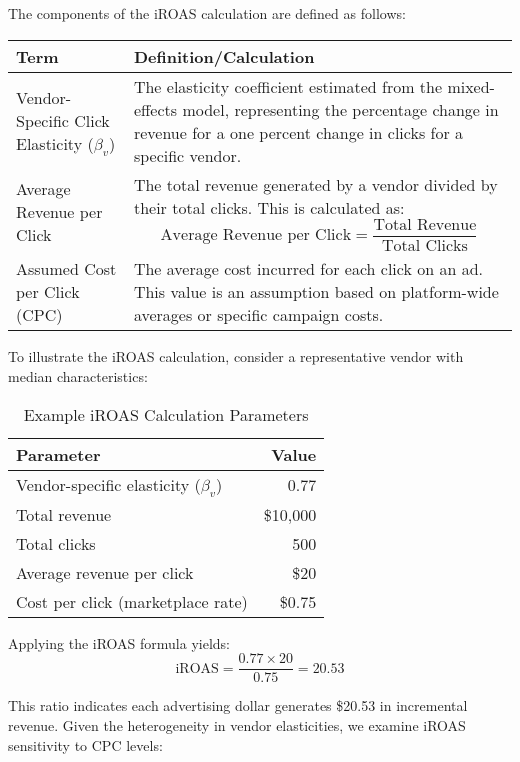 The components of the iROAS calculation are defined as follows:
\begin{center}
\begin{tabular}{p{} p{}}
\toprule
Term & Definition/Calculation \\
\midrule
Vendor-Specific Click Elasticity ($\beta_v$) & The elasticity coefficient estimated from the mixed-effects model, representing the percentage change in revenue for a one percent change in clicks for a specific vendor. \\
Average Revenue per Click & The total revenue generated by a vendor divided by their total clicks. This is calculated as:
\begin{equation*} 
\text{Average Revenue per Click} = \frac{\text{Total Revenue}}{\text{Total Clicks}}
\end{equation*} \\
Assumed Cost per Click (CPC) & The average cost incurred for each click on an ad. This value is an assumption based on platform-wide averages or specific campaign costs. \\
\bottomrule
\end{tabular}
\end{center}

To illustrate the iROAS calculation, consider a representative vendor with median characteristics:

\begin{table}[htbp!]
\centering
\caption{Example iROAS Calculation Parameters}
\begin{tabular}{lr}
\toprule
Parameter & Value \\
\midrule
Vendor-specific elasticity ($\beta_v$) & 0.77 \\
Total revenue & \$10,000 \\
Total clicks & 500 \\
Average revenue per click & \$20 \\
Cost per click (marketplace rate) & \$0.75 \\
\bottomrule
\end{tabular}
\end{table}

Applying the iROAS formula yields:
\begin{equation}
\text{iROAS} = \frac{0.77 \times 20}{0.75} = 20.53
\end{equation}

This ratio indicates each advertising dollar generates \$20.53 in incremental revenue. Given the heterogeneity in vendor elasticities, we examine iROAS sensitivity to CPC levels:

